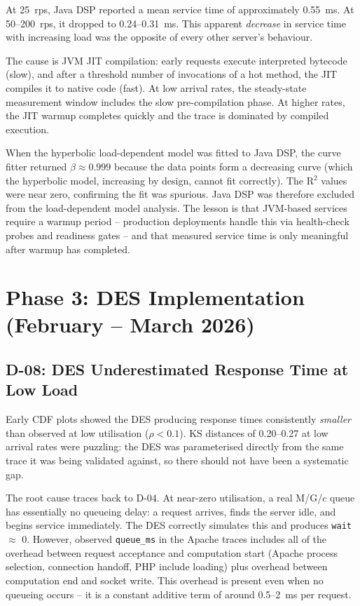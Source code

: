 At 25~rps, Java DSP reported a mean service time of approximately 0.55~ms. At 50--200~rps, it dropped to 0.24--0.31~ms. This apparent \emph{decrease} in service time with increasing load was the opposite of every other server's behaviour.

The cause is JVM JIT compilation: early requests execute interpreted bytecode (slow), and after a threshold number of invocations of a hot method, the JIT compiles it to native code (fast). At low arrival rates, the steady-state measurement window includes the slow pre-compilation phase. At higher rates, the JIT warmup completes quickly and the trace is dominated by compiled execution.

When the hyperbolic load-dependent model was fitted to Java DSP, the curve fitter returned $\beta \approx 0.999$ because the data points form a decreasing curve (which the hyperbolic model, increasing by design, cannot fit correctly). The R$^2$ values were near zero, confirming the fit was spurious. Java DSP was therefore excluded from the load-dependent model analysis. The lesson is that JVM-based services require a warmup period -- production deployments handle this via health-check probes and readiness gates -- and that measured service time is only meaningful after warmup has completed.

\section{Phase 3: DES Implementation (February -- March 2026)}
\label{sec:journey-phase3}

\subsection{D-08: DES Underestimated Response Time at Low Load}

Early CDF plots showed the DES producing response times consistently \emph{smaller} than observed at low utilisation ($\rho < 0.1$). KS distances of 0.20--0.27 at low arrival rates were puzzling: the DES was parameterised directly from the same trace it was being validated against, so there should not have been a systematic gap.

The root cause traces back to D-04. At near-zero utilisation, a real M/G/$c$ queue has essentially no queueing delay: a request arrives, finds the server idle, and begins service immediately. The DES correctly simulates this and produces \texttt{wait} $\approx$ 0. However, observed \texttt{queue\_ms} in the Apache traces includes all of the overhead between request acceptance and computation start (Apache process selection, connection handoff, PHP include loading) plus overhead between computation end and socket write. This overhead is present even when no queueing occurs -- it is a constant additive term of around 0.5--2~ms per request.

